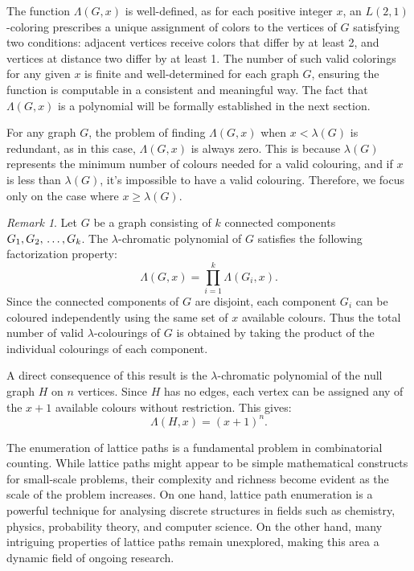 \documentclass{birkjour}
\theoremstyle{definition}
\theoremstyle{remark}
\newtheorem{remark}[theorem]{Remark}
\numberwithin{equation}{section}
\begin{document}
The function \( \Lambda(G, x) \) is well-defined, as for each positive integer \( x \), an \( L(2,1) \)-coloring prescribes a unique assignment of colors to the vertices of \( G \) satisfying two conditions: adjacent vertices receive colors that differ by at least 2, and vertices at distance two differ by at least 1. The number of such valid colorings for any given \( x \) is finite and well-determined for each graph \( G \), ensuring the function is computable in a consistent and meaningful way. The fact that \( \Lambda(G, x) \) is a polynomial will be formally established in the next section.

\noindent

 For any graph \( G \), the problem of finding \( \Lambda(G, x) \) when \( x < \lambda(G) \) is redundant, as in this case, \( \Lambda(G, x) \) is always zero. This is because \( \lambda(G) \) represents the minimum number of colours needed for a valid colouring, and if \( x \) is less than \( \lambda(G) \), it's impossible to have a valid colouring. Therefore, we focus only on the case where \( x \geq \lambda(G) \).
\begin{remark}
Let \( G \) be a graph consisting of \( k \) connected components \( G_1, G_2,$ 
\noindent $\ldots, G_k \). 
The \( \lambda \)-chromatic polynomial of \( G \) satisfies the following factorization property:
\[
\Lambda(G, x) = \prod_{i=1}^k \Lambda(G_i, x).
\]
Since the connected components of \( G \) are disjoint, each component \( G_i \) can be coloured independently using the same set of \( x \) available colours. Thus the total number of valid \( \lambda \)-colourings of \( G \) is obtained by taking the product of the individual colourings of each component.

A direct consequence of this result is the \( \lambda \)-chromatic polynomial of the null graph \( H \) on \( n \) vertices. Since \( H \) has no edges, each vertex can be assigned any of the \( x+1 \) available colours without restriction. This gives:
\[
\Lambda(H, x) = (x+1)^{n}.
\]
\end{remark}

The enumeration of lattice paths is a fundamental problem in combinatorial counting. While lattice paths might appear to be simple mathematical constructs for small-scale problems, their complexity and richness become evident as the scale of the problem increases. On one hand, lattice path enumeration is a powerful technique for analysing discrete structures in fields such as chemistry, physics, probability theory, and computer science. On the other hand, many intriguing properties of lattice paths remain unexplored, making this area a dynamic field of ongoing research.
\end{document}
